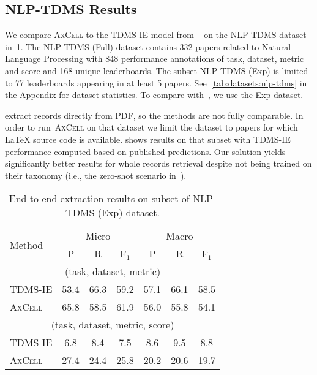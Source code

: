 \documentclass[11pt,a4paper]{article}
\newcommand{\model}{\textsc{AxCell}}
\begin{document}
\subsection{NLP-TDMS Results}

We compare \model{} to the TDMS-IE model from ~\citet{ibm-extraction} on the NLP-TDMS dataset in~\cref{tab:results:end-to-end:nlp-tdms}. The NLP-TDMS (Full) dataset contains 332 papers related to Natural Language Processing with 848 performance annotations of task, dataset, metric and score and 168 unique leaderboards. The subset NLP-TDMS (Exp) is limited to 77 leaderboards appearing in at least 5 papers. See~\cref{tab:datasets:nlp-tdms} in the Appendix for dataset statistics. To compare with~\citet{ibm-extraction}, we use the Exp dataset.

\citet{ibm-extraction} extract records directly from PDF, so the methods are not fully comparable. In order to run~\model{} on that dataset we limit the dataset to papers for which \LaTeX{} source code is available.
 shows results on that subset with TDMS-IE performance computed based on published predictions. Our solution yields significantly better results for whole records retrieval despite not being trained on their taxonomy (i.e., the zero-shot scenario in~\citet{ibm-extraction}).

\label{sec:experiments:nlptdms}
\begin{table}[t]
    \centering
    \setlength{\tabcolsep}{4pt}
    \caption{End-to-end extraction results on subset of NLP-TDMS (Exp) dataset.}
    \label{tab:results:end-to-end:nlp-tdms}
    \small
    \begin{tabular}{lcccccc}
     \toprule
  \multirow{2}{*}{Method} & \multicolumn{3}{c}{Micro} & \multicolumn{3}{c}{Macro}\\
  \cmidrule(lr){2-4}\cmidrule(lr){5-7}
   & P & R & F$_1$ & P & R & F$_1$\\\midrule
   \multicolumn{7}{c}{(task, dataset, metric)}\\\midrule
TDMS-IE  & 53.4 & 66.3 & 59.2 & 57.1 & 66.1 & 58.5\\
\model{} & 65.8 & 58.5 & 61.9 & 56.0 & 55.8 & 54.1\\
\midrule
  \multicolumn{7}{c}{(task, dataset, metric, score)}\\\midrule
TDMS-IE  & 6.8 & 8.4 & 7.5 & 8.6 & 9.5 & 8.8\\
\model{} & 27.4 & 24.4 & 25.8 & 20.2 & 20.6 & 19.7\\
     \bottomrule
    \end{tabular}
\end{table}
\end{document}
